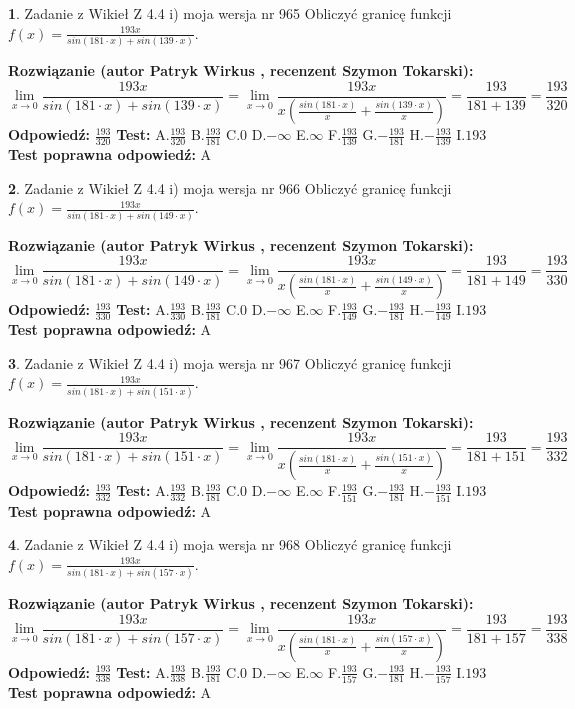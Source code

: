 \documentclass[12pt, a4paper]{article}
\theoremstyle{definition} %
\newtheorem{zad}{}
\newcommand{\zadStart}[1]{\begin{zad}#1\newline}
\newcommand{\zadStop}{\end{zad}}
\newcommand{\rozwStart}[2]{\noindent \textbf{Rozwiązanie (autor #1 , recenzent #2): }\newline}
\newcommand{\rozwStop}{\newline}
\newcommand{\odpStart}{\noindent \textbf{Odpowiedź:}\newline}
\newcommand{\odpStop}{\newline}
\newcommand{\testStart}{\noindent \textbf{Test:}\newline}
\newcommand{\testStop}{\newline}
\newcommand{\kluczStart}{\noindent \textbf{Test poprawna odpowiedź:}\newline}
\newcommand{\kluczStop}{\newline}
\begin{document}
\zadStart{Zadanie z Wikieł Z 4.4 i) moja wersja nr 965}
Obliczyć granicę funkcji $f(x)=\frac{193x}{sin(181\cdot x) +sin(139\cdot x)}$.
\zadStop
\rozwStart{Patryk Wirkus}{Szymon Tokarski}
$$\lim\limits_{x\to 0}\frac{193x}{sin(181\cdot x) +sin(139\cdot x)}=\lim\limits_{x\to 0}\frac{193x}{x(\frac{sin(181\cdot x)}{x}+\frac{sin(139\cdot x)}{x})}=\frac{193}{181+139} = \frac{193}{320}$$
\rozwStop
\odpStart
$\frac{193}{320}$
\odpStop
\testStart
A.$\frac{193}{320}$
B.$\frac{193}{181}$
C.$0$
D.$-\infty$
E.$\infty$
F.$\frac{193}{139}$
G.$-\frac{193}{181}$
H.$-\frac{193}{139}$
I.$193$
\testStop
\kluczStart
A
\kluczStop



\zadStart{Zadanie z Wikieł Z 4.4 i) moja wersja nr 966}
Obliczyć granicę funkcji $f(x)=\frac{193x}{sin(181\cdot x) +sin(149\cdot x)}$.
\zadStop
\rozwStart{Patryk Wirkus}{Szymon Tokarski}
$$\lim\limits_{x\to 0}\frac{193x}{sin(181\cdot x) +sin(149\cdot x)}=\lim\limits_{x\to 0}\frac{193x}{x(\frac{sin(181\cdot x)}{x}+\frac{sin(149\cdot x)}{x})}=\frac{193}{181+149} = \frac{193}{330}$$
\rozwStop
\odpStart
$\frac{193}{330}$
\odpStop
\testStart
A.$\frac{193}{330}$
B.$\frac{193}{181}$
C.$0$
D.$-\infty$
E.$\infty$
F.$\frac{193}{149}$
G.$-\frac{193}{181}$
H.$-\frac{193}{149}$
I.$193$
\testStop
\kluczStart
A
\kluczStop



\zadStart{Zadanie z Wikieł Z 4.4 i) moja wersja nr 967}
Obliczyć granicę funkcji $f(x)=\frac{193x}{sin(181\cdot x) +sin(151\cdot x)}$.
\zadStop
\rozwStart{Patryk Wirkus}{Szymon Tokarski}
$$\lim\limits_{x\to 0}\frac{193x}{sin(181\cdot x) +sin(151\cdot x)}=\lim\limits_{x\to 0}\frac{193x}{x(\frac{sin(181\cdot x)}{x}+\frac{sin(151\cdot x)}{x})}=\frac{193}{181+151} = \frac{193}{332}$$
\rozwStop
\odpStart
$\frac{193}{332}$
\odpStop
\testStart
A.$\frac{193}{332}$
B.$\frac{193}{181}$
C.$0$
D.$-\infty$
E.$\infty$
F.$\frac{193}{151}$
G.$-\frac{193}{181}$
H.$-\frac{193}{151}$
I.$193$
\testStop
\kluczStart
A
\kluczStop



\zadStart{Zadanie z Wikieł Z 4.4 i) moja wersja nr 968}
Obliczyć granicę funkcji $f(x)=\frac{193x}{sin(181\cdot x) +sin(157\cdot x)}$.
\zadStop
\rozwStart{Patryk Wirkus}{Szymon Tokarski}
$$\lim\limits_{x\to 0}\frac{193x}{sin(181\cdot x) +sin(157\cdot x)}=\lim\limits_{x\to 0}\frac{193x}{x(\frac{sin(181\cdot x)}{x}+\frac{sin(157\cdot x)}{x})}=\frac{193}{181+157} = \frac{193}{338}$$
\rozwStop
\odpStart
$\frac{193}{338}$
\odpStop
\testStart
A.$\frac{193}{338}$
B.$\frac{193}{181}$
C.$0$
D.$-\infty$
E.$\infty$
F.$\frac{193}{157}$
G.$-\frac{193}{181}$
H.$-\frac{193}{157}$
I.$193$
\testStop
\kluczStart
A
\kluczStop
\end{document}
